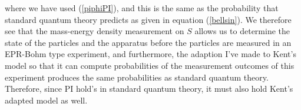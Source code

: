 where we have used (\ref{piphiPI}), and this is the same as the probability that standard quantum theory predicts as given in equation (\ref{bellsin}). We therefore see that the mass-energy density measurement on $S$ allows us to determine the state of the particles and the apparatus before the particles are measured in an EPR-Bohm type experiment, and furthermore, the adaption I've made to Kent's model so that it can compute probabilities of the measurement outcomes of this experiment produces the same probabilities as standard quantum theory. Therefore, since PI hold's in standard quantum theory, it must also hold Kent's adapted model as well.\label{kentpiend}


